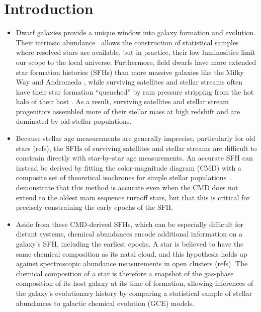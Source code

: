 \documentclass[ms.tex]{subfiles}
\begin{document}
\section{Introduction}
\label{sec:intro}

\begin{itemize}

	\item Dwarf galaxies provide a unique window into galaxy formation and
	evolution.
	Their intrinsic abundance~\citep{Bell2003, Baldry2012} allows the
	construction of statistical samples where resolved stars are available, but
	in practice, their low luminosities limit our scope to the local universe.
	Furthermore, field dwarfs have more extended star formation histories (SFHs)
	than more massive galaxies like the Milky Way and Andromeda
	\citep[e.g.][]{Behroozi2019}, while surviving satellites and stellar
	streams often have their star formation ``quenched'' by ram pressure
	stripping from the hot halo of their host
	\citep*[see discussion in, e.g.,][]{Steyrleithner2020}.
	As a result, surviving satellites and stellar stream progenitors assembled
	more of their stellar mass at high redshift and are dominated by old
	stellar populations.

	\item Because stellar age measurements are generally imprecise,
	particularly for old stars (refs), the SFHs of surviving satellites and
	stellar streams are difficult to constrain directly with star-by-star age
	measurements.
	An accurate SFH can instead be derived by fitting the color-magnitude
	diagram (CMD) with a composite set of theoretical isochrones for simple
	stellar populations~\citep[e.g.][]{Dolphin2002}.
	\citet{Weisz2014} demonstrate that this method is accurate even when the
	CMD does not extend to the oldest main sequence turnoff stars, but that
	this is critical for precisely constraining the early epochs of the SFH.

	\item Aside from these CMD-derived SFHs, which can be especially difficult
	for distant systems, chemical abundances encode additional information on a
	galaxy's SFH, including the earliest epochs.
	A star is believed to have the same chemical composition as its natal
	cloud, and this hypothesis holds up against spectroscopic abundance
	measurements in open clusters (refs).
	The chemical composition of a star is therefore a snapshot of the
	gas-phase composition of its host galaxy at its time of formation, allowing
	inferences of the galaxy's evolutionary history by comparing a statistical
	sample of stellar abundances to galactic chemical evolution (GCE) models.


\end{itemize}
\end{document}
